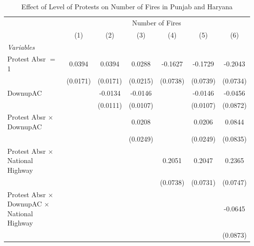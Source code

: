 
\begin{table}[htbp]
   \caption{\label{tab:protest_treat_main} Effect of Level of Protests on Number of Fires in Punjab and Haryana}
   \centering
   \begin{tabular}{lcccccc}
      \tabularnewline \midrule \midrule
       & \multicolumn{6}{c}{Number of Fires}\\
                                                                 & (1)           & (2)           & (3)           & (4)           & (5)           & (6)\\  
      \midrule
      \emph{Variables}\\
      Protest Absr $=$ 1                                         & 0.0394        & 0.0394        & 0.0288        & -0.1627       & -0.1729       & -0.2043\\   
                                                                 & (0.0171)      & (0.0171)      & (0.0215)      & (0.0738)      & (0.0739)      & (0.0734)\\   
      DownupAC                                                   &               & -0.0134       & -0.0146       &               & -0.0146       & -0.0456\\   
                                                                 &               & (0.0111)      & (0.0107)      &               & (0.0107)      & (0.0872)\\   
      Protest Absr $\times$ DownupAC                             &               &               & 0.0208        &               & 0.0206        & 0.0844\\   
                                                                 &               &               & (0.0249)      &               & (0.0249)      & (0.0835)\\   
      Protest Absr $\times$ National Highway                     &               &               &               & 0.2051        & 0.2047        & 0.2365\\   
                                                                 &               &               &               & (0.0738)      & (0.0731)      & (0.0747)\\   
      Protest Absr $\times$ DownupAC $\times$ National Highway   &               &               &               &               &               & -0.0645\\   
                                                                 &               &               &               &               &               & (0.0873)\\   

\end{tabular}
\end{table}
